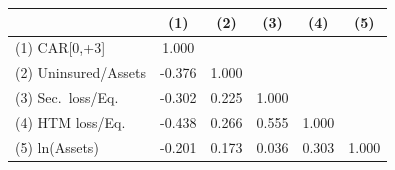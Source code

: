 \begin{tabular}{lccccc}
\toprule
& (1) & (2) & (3) & (4) & (5) \\
\midrule
(1) CAR[0,+3] & 1.000 &  &  &  &  \\
(2) Uninsured/Assets & -0.376 & 1.000 &  &  &  \\
(3) Sec.\ loss/Eq. & -0.302 & 0.225 & 1.000 &  &  \\
(4) HTM loss/Eq. & -0.438 & 0.266 & 0.555 & 1.000 &  \\
(5) ln(Assets) & -0.201 & 0.173 & 0.036 & 0.303 & 1.000 \\
\bottomrule
\end{tabular}